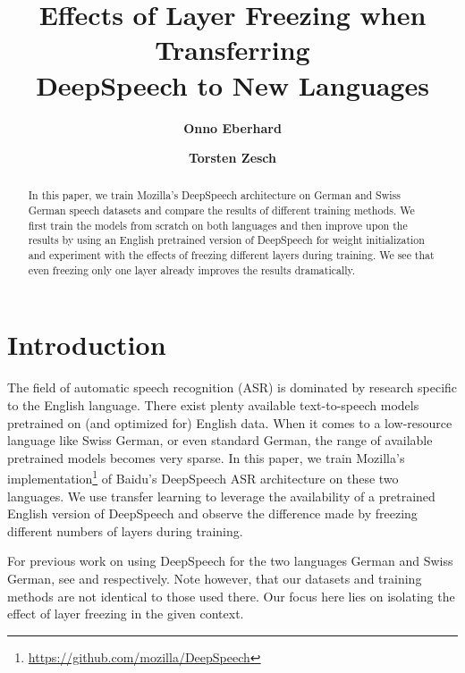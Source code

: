 \documentclass[11pt]{article}
\title{Effects of Layer Freezing when Transferring\\DeepSpeech to New Languages}
\author[1]{\textbf{Onno Eberhard}}
\author[ ]{\textbf{Torsten Zesch}}
\affil[ ]{Language Technology Lab}
\affil[ ]{University of Duisburg-Essen}
\affil[1]{\href{mailto:onno.eberhard@stud.uni-due.de}{\texttt{onno.eberhard@stud.uni-due.de}}}
\date{}
\begin{document}
\maketitle

\begin{abstract}\noindent
In this paper, we train Mozilla's DeepSpeech architecture on German and Swiss German speech datasets and compare the results of different training methods. We first train the models from scratch on both languages and then improve upon the results by using an English pretrained version of DeepSpeech for weight initialization and experiment with the effects of freezing different layers during training. We see that even freezing only one layer already improves the results dramatically.
\end{abstract}

\section{Introduction}
The field of automatic speech recognition (ASR) is dominated by research specific to the English language. There exist plenty available text-to-speech models pretrained on (and optimized for) English data. When it comes to a low-resource language like Swiss German, or even standard German, the range of available pretrained models becomes very sparse. In this paper, we train Mozilla's implementation\footnote{\url{https://github.com/mozilla/DeepSpeech}} of Baidu's DeepSpeech ASR architecture \parencite{hannun2014deep} on these two languages. We use transfer learning to leverage the availability of a pretrained English version of DeepSpeech and observe the difference made by freezing different numbers of layers during training.

For previous work on using DeepSpeech for the two languages German and Swiss German, see \parencite{agarwal-zesch-2019-german} and \parencite{agarwal2020ltl} respectively. Note however, that our datasets and training methods are not identical to those used there. Our focus here lies on isolating the effect of layer freezing in the given context.
\end{document}
